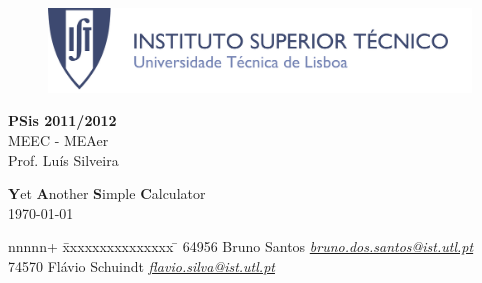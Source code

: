 \pagestyle{empty}		%


\begin{figure}[h!]
	\centering
	\includegraphics[width=\textwidth]{img/others/ISTheader}
\end{figure}

\vspace{10mm}
\begin{flushleft}
	\huge{\textbf{PSis 2011/2012}}\\
	\LARGE{MEEC - MEAer}\\
	\Large{Prof. Luís Silveira}
\end{flushleft}

\vspace{20mm}
\begin{center}
	\Huge{\textbf{Y}et \textbf{A}nother \textbf{S}imple \textbf{C}alculator}\\
	\vspace{5mm}
	\large{\today}
\end{center}


\vspace{80mm}
\large{
	\begin{tabbing}			%
		\hspace{50mm}nnnnn+ \= xxxxxxxxxxxxxxx \= \kill
		\hspace{50mm}64956 \> Bruno Santos \> \href{mailto:bruno.dos.santos@ist.utl.pt}{\emph{bruno.dos.santos@ist.utl.pt}} \\
		\hspace{50mm}74570 \> Flávio Schuindt \> \href{mailto:flavio.silva@ist.utl.pt}{\emph{flavio.silva@ist.utl.pt}}
	\end{tabbing}
}

\blankpage

